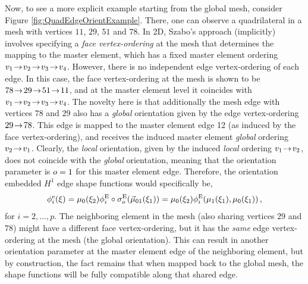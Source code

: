 Now, to see a more explicit example starting from the global mesh, consider Figure \ref{fig:QuadEdgeOrientExample}.
There, one can observe a quadrilateral in a mesh with vertices $11$, $29$, $51$ and $78$.
In 2D, Szabo's approach (implicitly) involves specifying a \textit{face vertex-ordering} at the mesh that determines the mapping to the master element, which has a fixed master element ordering $v_1\!\to\! v_2\!\to\! v_3\!\to\! v_4$.
However, there is no independent edge vertex-ordering of each edge.
In this case, the face vertex-ordering at the mesh is shown to be $78\!\to\!29\!\to\!51\!\to\!11$, and at the master element level it coincides with $v_1\!\to\! v_2\!\to\! v_3\!\to\! v_4$.
The novelty here is that additionally the mesh edge with vertices $78$ and $29$ also has a \textit{global} orientation given by the edge vertex-ordering $29\!\to\!78$.
This edge is mapped to the master element edge 12 (as induced by the face vertex-ordering), and receives the induced master element \textit{global} ordering $v_2\!\to\! v_1$. 
Clearly, the \textit{local} orientation, given by the induced \textit{local} ordering $v_1\tdashto v_2$, does not coincide with the \textit{global} orientation, meaning that the orientation parameter is $o=1$ for this master element edge.
Therefore, the orientation embedded $H^1$ edge shape functions would specifically be,
\begin{equation*}
    \phi_i^\mathrm{e}(\xi)=\mu_0(\xi_2)\phi_i^{\mathrm{E}}\circ\sigma_o^{\mathrm{E}}(\vec{\mu}_{01}(\xi_1))
            	=\mu_0(\xi_2)\phi_i^{\mathrm{E}}(\mu_1(\xi_1),\mu_0(\xi_1))\,,
\end{equation*}
for $i=2,\ldots,p$. 
The neighboring element in the mesh (also sharing vertices $29$ and $78$) might have a different face vertex-ordering, but it has the \textit{same} edge vertex-ordering at the mesh (the global orientation). 
This can result in another orientation parameter at the master element edge of the neighboring element, but by construction, the fact remains that when mapped back to the global mesh, the shape functions will be fully compatible along that shared edge.  

